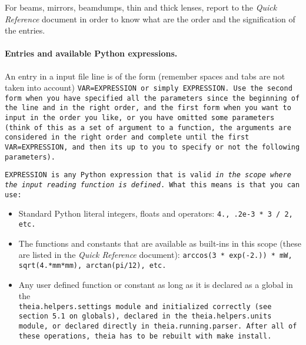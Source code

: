 \documentclass{article}
\begin{document}
For beams, mirrors, beamdumps, thin and thick lenses, report to the \textit{Quick Reference} document in order to know what are the order and the signification of the entries.

\paragraph{Entries and available Python expressions.}An entry in a input file line is of the form (remember spaces and tabs are not taken into account) \tt{VAR=EXPRESSION} or simply \tt{EXPRESSION}. Use the second form when you have specified all the parameters since the beginning of the line and in the right order, and the first form when you want to input in the order you like, or you have omitted some parameters (think of this as a set of argument to a function, the arguments are considered in the right order and complete until the first \tt{VAR=EXPRESSION}, and then its up to you to specify or not the following parameters). 

\tt{EXPRESSION} is any Python expression that is valid \textit{in the scope where the input reading function is defined}. What this means is that you can use:
\begin{itemize}
\item Standard Python literal integers, floats and operators: \tt{4.}, \tt{.2e-3 * 3 / 2}, etc.
\item The functions and constants that are available as built-ins in this scope (these are listed in the \textit{Quick Reference} document): \tt{arccos(3 * exp(-2.)) * mW}, \tt{sqrt(4.*mm*mm)}, \tt{arctan(pi/12)}, etc.
\item Any user defined function or constant as long as it is declared as a global in the \\ \tt{theia.helpers.settings} module and initialized correctly (see section 5.1 on globals), declared in the \tt{theia.helpers.units} module, or declared directly in \tt{theia.running.parser}. After all of these operations, \tt{theia} has to be rebuilt with \tt{make install}.
\end{itemize}




\end{document}
